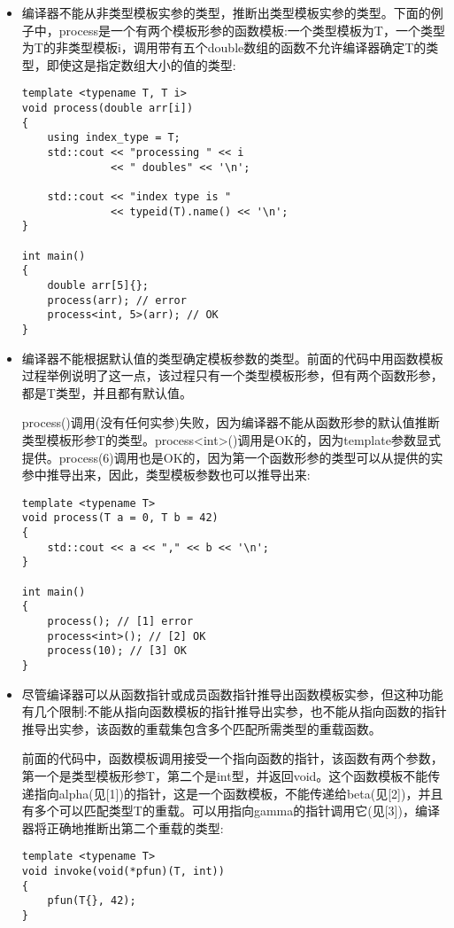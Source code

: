 \begin{itemize}
\item
编译器不能从非类型模板实参的类型，推断出类型模板实参的类型。下面的例子中，process是一个有两个模板形参的函数模板:一个类型模板为T，一个类型为T的非类型模板i，调用带有五个double数组的函数不允许编译器确定T的类型，即使这是指定数组大小的值的类型:

\begin{lstlisting}[style=styleCXX]
template <typename T, T i>
void process(double arr[i])
{
	using index_type = T;
	std::cout << "processing " << i
	          << " doubles" << '\n';
	          
	std::cout << "index type is "
              << typeid(T).name() << '\n';
}

int main()
{
	double arr[5]{};
	process(arr); // error
	process<int, 5>(arr); // OK
}
\end{lstlisting}

\item
编译器不能根据默认值的类型确定模板参数的类型。前面的代码中用函数模板过程举例说明了这一点，该过程只有一个类型模板形参，但有两个函数形参，都是T类型，并且都有默认值。

process()调用(没有任何实参)失败，因为编译器不能从函数形参的默认值推断类型模板形参T的类型。process<int>()调用是OK的，因为template参数显式提供。process(6)调用也是OK的，因为第一个函数形参的类型可以从提供的实参中推导出来，因此，类型模板参数也可以推导出来:

\begin{lstlisting}[style=styleCXX]
template <typename T>
void process(T a = 0, T b = 42)
{
	std::cout << a << "," << b << '\n';
}

int main()
{
	process(); // [1] error
	process<int>(); // [2] OK
	process(10); // [3] OK
}
\end{lstlisting}

\item
尽管编译器可以从函数指针或成员函数指针推导出函数模板实参，但这种功能有几个限制:不能从指向函数模板的指针推导出实参，也不能从指向函数的指针推导出实参，该函数的重载集包含多个匹配所需类型的重载函数。

前面的代码中，函数模板调用接受一个指向函数的指针，该函数有两个参数，第一个是类型模板形参T，第二个是int型，并返回void。这个函数模板不能传递指向alpha(见[1])的指针，这是一个函数模板，不能传递给beta(见[2])，并且有多个可以匹配类型T的重载。可以用指向gamma的指针调用它(见[3])，编译器将正确地推断出第二个重载的类型:

\begin{lstlisting}[style=styleCXX]
template <typename T>
void invoke(void(*pfun)(T, int))
{
	pfun(T{}, 42);
}


\end{lstlisting}
\end{itemize}
